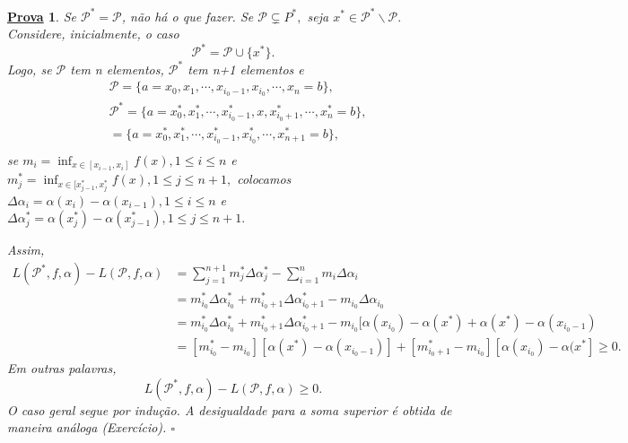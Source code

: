 \documentclass{article}
\newtheorem*{proof*}{\underline{Prova}}
\begin{document}
 \begin{proof*}
  Se \(\mathcal{P}^{*} = \mathcal{P}\), não há o que fazer. Se \(\mathcal{P}\subsetneq{P}^{*},\) seja \(x^{*}\in \mathcal{P}^{*}\backslash \mathcal{P}.\) Considere,
  inicialmente, o caso 
    \[
      \mathcal{P}^{*} = \mathcal{P}\cup\{x^{*}\}.
    \]
  Logo, se \(\mathcal{P}\) tem n elementos, \(\mathcal{P}^{*}\) tem n+1 elementos e 
 \begin{align*}
   &\mathcal{P} = \{a = x_{0}, x_{1}, \cdots, x_{i_{0}-1}, x_{i_{0}}, \cdots, x_{n} = b\},\\
   &\mathcal{P}^{*} = \{a = x_{0}^{*}, x_{1}^{*}, \cdots, x_{i_{0}-1}^{*}, x, x_{i_{0}+1}^{*}, \cdots, x_{n}^{*} = b\},\\
   &=\{a = x_{0}^{*}, x_{1}^{*}, \cdots, x_{i_{0}-1}^{*}, x_{i_{0}}^{*}, \cdots, x_{n+1}^{*} = b\},\\ 
 \end{align*}
 se \(m_{i} = \inf_{x\in[x_{i-1}, x_{i}]}f(x), 1\leq i\leq n\) e \(m_{j}^{*} = \inf_{x\in[x_{j-1}^{*}, x_{j}^{*}}f(x), 1\leq j\leq n+1,\) colocamos
 \(\Delta \alpha_{i} = \alpha (x_{i}) - \alpha (x_{i-1}), 1\leq i\leq n\) e \(\Delta \alpha_{j}^{*} = \alpha (x_{j}^{*}) - \alpha (x_{j-1}^{*}), 1\leq j\leq n+1.\)

 Assim, 
\begin{align*}
  L(\mathcal{P}^{*}, f, \alpha ) - L(\mathcal{P}, f, \alpha ) &= \sum\limits_{j=1}^{n+1}m_{j}^{*}\Delta \alpha_{j}^{*} - \sum\limits_{i=1}^{n}m_{i}\Delta \alpha_{i}\\
                                                              &= m_{i_{0}}^{*}\Delta \alpha_{i_{0}}^{*} + m_{i_{0}+1}^{*}\Delta \alpha _{i_{0}+1}^{*} - m_{i_{0}}\Delta \alpha _{i_{0}}\\
                                                              &= m_{i_{0}}^{*}\Delta \alpha_{i_{0}}^{*} + m_{i_{0}+1}^{*}\Delta \alpha _{i_{0}+1}^{*} - m_{i_{0}}[\alpha (x_{i_{0}}) - \alpha (x^{*})+\alpha (x^{*}) - \alpha (x_{i_{0}-1})\\
                                                              &= [m_{i_{0}}^{*} - m_{i_{0}}][\alpha (x^{*}) - \alpha (x_{i_{0}-1})] + [m_{i_{0}+1}^{*} - m_{i_{0}}][\alpha (x_{i_{0}}) - \alpha (x^{*}]\geq 0.
\end{align*}
Em outras palavras, 
  \[
    L(\mathcal{P}^{*}, f, \alpha ) - L(\mathcal{P}, f, \alpha )\geq 0.
  \]
O caso geral segue por indu\c cão. A desigualdade para a soma superior é obtida de maneira análoga (Exercício). \(\square\)
 \end{proof*}
\end{document}
